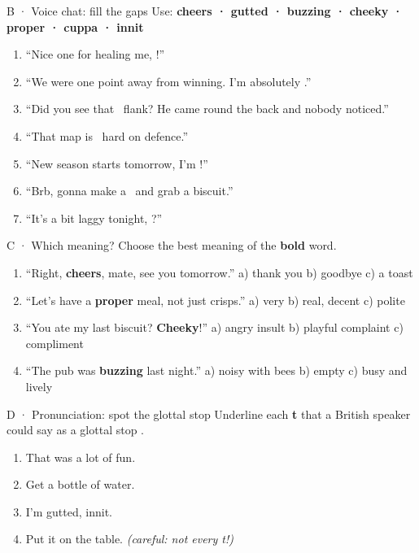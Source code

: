 \documentclass[11pt,a4paper]{article}
\newcommand{\ipa}[1]{{\color{sproutdark}\textipa{#1}}}
\newcommand{\blank}[1][2.6cm]{\underline{\hspace{#1}}}
\begin{document}
\begin{exbox}{B · Voice chat: fill the gaps}
Use: \textbf{cheers · gutted · buzzing · cheeky · proper · cuppa · innit}
\begin{enumerate}
  \item ``Nice one for healing me, \blank!''
  \item ``We were one point away from winning. I'm absolutely \blank.''
  \item ``Did you see that \blank\ flank? He came round the back and nobody noticed.''
  \item ``That map is \blank\ hard on defence.''
  \item ``New season starts tomorrow, I'm \blank!''
  \item ``Brb, gonna make a \blank\ and grab a biscuit.''
  \item ``It's a bit laggy tonight, \blank?''
\end{enumerate}
\end{exbox}

\begin{exbox}{C · Which meaning?}
Choose the best meaning of the \textbf{bold} word.
\begin{enumerate}
  \item ``Right, \textbf{cheers}, mate, see you tomorrow.'' \quad a) thank you \quad b) goodbye \quad c) a toast
  \item ``Let's have a \textbf{proper} meal, not just crisps.'' \quad a) very \quad b) real, decent \quad c) polite
  \item ``You ate my last biscuit? \textbf{Cheeky}!'' \quad a) angry insult \quad b) playful complaint \quad c) compliment
  \item ``The pub was \textbf{buzzing} last night.'' \quad a) noisy with bees \quad b) empty \quad c) busy and lively
\end{enumerate}
\end{exbox}

\begin{exbox}{D · Pronunciation: spot the glottal stop}
Underline each \textbf{t} that a British speaker could say as a glottal stop \ipa{/P/}.
\begin{enumerate}
  \item That was a lot of fun.
  \item Get a bottle of water.
  \item I'm gutted, innit.
  \item Put it on the table.  \quad \textit{(careful: not every t!)}
\end{enumerate}
\end{exbox}
\end{document}
